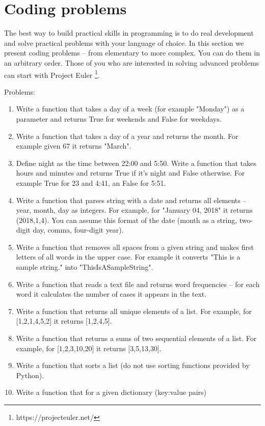 \section{Coding problems}

The best way to build practical skills in programming is to do
real development and solve practical problems with your language
of choice. In this section we present coding problems -- from elementary
to more complex. You can do them in an arbitrary order. Those of
you who are interested in solving advanced problems can start 
with Project Euler \footnote{https://projecteuler.net/}.

Problems:

\begin{enumerate}
\item Write a function that takes a day of a week (for example "Monday")
as a parameter and returns True for weekends and False for weekdays.
\item Write a function that takes a day of a year and returns 
the month. For example given 67 it returns "March".
\item Define night as the time between 22:00 and 5:50. 
Write a function that takes hours and minutes and returns True if
it's night and False otherwise. For example True for 23 and 4:41, 
an False for 5:51.
\item Write a function that parses string with a date and returns
all elements -- year, month, day as integers. For example, for
"January 04, 2018" it returns (2018,1,4). You can assume this format of
the date (month as a string, two-digit day, comma, four-digit year).
\item Write a function that removes all spaces from a given string
and makes first letters of all words in the upper case. For example
it converts "This is a sample string." into "ThisIsASampleString".
\item Write a function that reads a text file and returns word frequencies 
-- for each word it calculates the number of cases it appears in the
text.
\item Write a function that returns all unique elements of a list. 
For example, for [1,2,1,4,5,2] it returns [1,2,4,5].
\item Write a function that returns a sums of two sequential elements of
a list. For example, for [1,2,3,10,20] it returns [3,5,13,30]. 
\item Write a function that sorts a list (do not use sorting functions 
provided by Python). 
\item Write a function that for a given dictionary (key:value pairs)

\end{enumerate}
